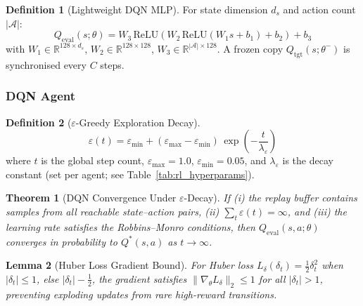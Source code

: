 \documentclass[12pt,a4paper]{article}
\theoremstyle{definition}
\newtheorem{definition}{Definition}[section]
\theoremstyle{plain}
\newtheorem{theorem}{Theorem}[section]
\newtheorem{lemma}[theorem]{Lemma}
\theoremstyle{remark}
\newcommand{\R}{\mathbb{R}}
\begin{document}
\begin{definition}[Lightweight DQN MLP]
\label{def:dqn_mlp}
For state dimension $d_s$ and action count $|\mathcal{A}|$:
\[
  Q_{\text{eval}}(s;\theta) =
  W_3\,\mathrm{ReLU}(W_2\,\mathrm{ReLU}(W_1 s + b_1) + b_2) + b_3
\]
with $W_1\!\in\!\R^{128\times d_s}$, $W_2\!\in\!\R^{128\times128}$,
$W_3\!\in\!\R^{|\mathcal{A}|\times128}$.
A frozen copy $Q_{\text{tgt}}(s;\theta^-)$ is synchronised every $C$ steps.
\end{definition}

\subsubsection{DQN Agent}

\begin{definition}[$\varepsilon$-Greedy Exploration Decay]
\[
  \varepsilon(t) = \varepsilon_{\min} +
  (\varepsilon_{\max} - \varepsilon_{\min})\,
  \exp\!\left(-\frac{t}{\lambda_\varepsilon}\right)
\]
where $t$ is the global step count, $\varepsilon_{\max}=1.0$,
$\varepsilon_{\min}=0.05$, and $\lambda_\varepsilon$ is the decay constant
(set per agent; see Table~\ref{tab:rl_hyperparams}).
\end{definition}

\begin{theorem}[DQN Convergence Under $\varepsilon$-Decay]
\label{thm:dqn_conv}
If (i) the replay buffer contains samples from all reachable state--action
pairs, (ii) $\sum_t \varepsilon(t) = \infty$, and (iii) the learning rate
satisfies the Robbins--Monro conditions, then $Q_{\text{eval}}(s,a;\theta)$
converges in probability to $Q^*(s,a)$ as $t\to\infty$.
\end{theorem}

\begin{lemma}[Huber Loss Gradient Bound]
For Huber loss $L_\delta(\delta_t) = \tfrac{1}{2}\delta_t^2$ when
$|\delta_t|\le 1$, else $|\delta_t| - \tfrac{1}{2}$, the gradient satisfies
$\|\nabla_\theta L_\delta\|_2 \le 1$ for all $|\delta_t|>1$, preventing
exploding updates from rare high-reward transitions.
\end{lemma}
\end{document}
